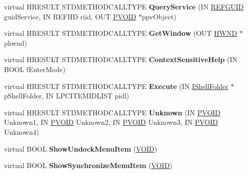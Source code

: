 \begin{DoxyCompactItemize}
\item 
\mbox{\label{class_c_start_menu_site_ade4e19284cd4d6e4d7ea08e0b62ddd65}} 
virtual H\+R\+E\+S\+U\+LT S\+T\+D\+M\+E\+T\+H\+O\+D\+C\+A\+L\+L\+T\+Y\+PE {\bfseries Query\+Service} (IN \hyperlink{struct___g_u_i_d}{R\+E\+F\+G\+U\+ID} guid\+Service, IN R\+E\+F\+I\+ID riid, O\+UT \hyperlink{interfacevoid}{P\+V\+O\+ID} $\ast$ppv\+Object)
\item 
\mbox{\label{class_c_start_menu_site_af5c6eb2c298360f60266337f814cd68a}} 
virtual H\+R\+E\+S\+U\+LT S\+T\+D\+M\+E\+T\+H\+O\+D\+C\+A\+L\+L\+T\+Y\+PE {\bfseries Get\+Window} (O\+UT \hyperlink{interfacevoid}{H\+W\+ND} $\ast$phwnd)
\item 
\mbox{\label{class_c_start_menu_site_a414058fc8b13a1be00182deeb4f23e0d}} 
virtual H\+R\+E\+S\+U\+LT S\+T\+D\+M\+E\+T\+H\+O\+D\+C\+A\+L\+L\+T\+Y\+PE {\bfseries Context\+Sensitive\+Help} (IN B\+O\+OL f\+Enter\+Mode)
\item 
\mbox{\label{class_c_start_menu_site_aff4e6234ac4cda2e4bc23ad98b80d240}} 
virtual H\+R\+E\+S\+U\+LT S\+T\+D\+M\+E\+T\+H\+O\+D\+C\+A\+L\+L\+T\+Y\+PE {\bfseries Execute} (IN \hyperlink{interface_i_shell_folder}{I\+Shell\+Folder} $\ast$p\+Shell\+Folder, IN L\+P\+C\+I\+T\+E\+M\+I\+D\+L\+I\+ST pidl)
\item 
\mbox{\label{class_c_start_menu_site_a733d6eb76dbc9accc99ede196fd970e9}} 
virtual H\+R\+E\+S\+U\+LT S\+T\+D\+M\+E\+T\+H\+O\+D\+C\+A\+L\+L\+T\+Y\+PE {\bfseries Unknown} (IN \hyperlink{interfacevoid}{P\+V\+O\+ID} Unknown1, IN \hyperlink{interfacevoid}{P\+V\+O\+ID} Unknown2, IN \hyperlink{interfacevoid}{P\+V\+O\+ID} Unknown3, IN \hyperlink{interfacevoid}{P\+V\+O\+ID} Unknown4)
\item 
\mbox{\label{class_c_start_menu_site_a66e0d7a5965f4d00f5d0e24c4d519ead}} 
virtual B\+O\+OL {\bfseries Show\+Undock\+Menu\+Item} (\hyperlink{interfacevoid}{V\+O\+ID})
\item 
\mbox{\label{class_c_start_menu_site_a39ad4147b7eb0fe6be88971500ae4b5d}} 
virtual B\+O\+OL {\bfseries Show\+Synchronize\+Menu\+Item} (\hyperlink{interfacevoid}{V\+O\+ID})

\end{DoxyCompactItemize}
